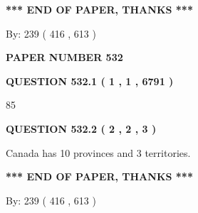 \documentclass[12pt]{article}
\begin{document}
\vspace{1.0in} 
{\textbf{\large{ *** END OF PAPER, THANKS *** }}} 
   
   
\hspace{1.0in} By: 
 239 ( 416 ,  613 )
   
   
   
   
\newpage 
\setcounter{page}{ 
   532001 } 
   
   
   
   
 {\textbf{ \Large{ PAPER NUMBER  532  }}}
   
   
\vspace{0.2in}
   
   
   
   
   
   
 \vspace{0.2in}
 
 
 
 
   
   
  
\vspace{0.2in}
  
{\textbf{\Large{QUESTION
532.1 
 ( 1 , 1 , 6791 )
}}}
  
  
 
 
\noindent{}

85
 
 
  
\vspace{0.2in}
  
{\textbf{\Large{QUESTION
532.2 
 ( 2 , 2 , 3 )
}}}
  
  
 
 
\noindent{}
 
 
Canada has 10  provinces and 3 territories.
 
 
 
 
   
   
 \vspace{0.2in}
 
   
   
   
   
\vspace{1.0in} 
{\textbf{\large{ *** END OF PAPER, THANKS *** }}} 
   
   
\hspace{1.0in} By: 
 239 ( 416 ,  613 )
   
\end{document}

